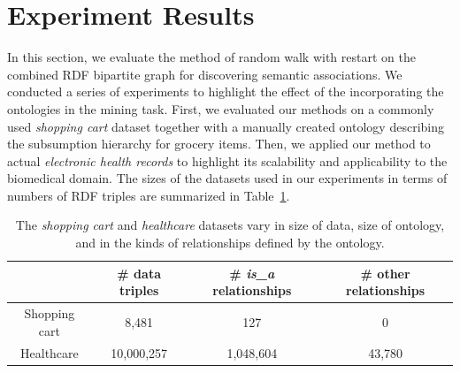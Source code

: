 \section{Experiment Results}
\label{experiment}
In this section, we evaluate the method of random walk with restart on the combined RDF bipartite graph for discovering semantic associations. We conducted a series of experiments to highlight the effect of the incorporating the ontologies in the mining task. First, we evaluated our methods on a commonly used \emph{shopping cart} dataset together with a manually created ontology describing the subsumption hierarchy for grocery items.  Then, we applied our method to actual \emph{electronic health records} to highlight its scalability and applicability to the biomedical domain. The sizes of the datasets used in our experiments in terms of numbers of RDF triples are summarized in Table~\ref{tbl:exp_overview}.


\begin{table}[tbh]\scriptsize
\begin{center}
\begin{tabular}{c|c|c|c}
\hline
    & \# data triples & \# \emph{is\_a} relationships & \# other relationships \\
    \hline
  Shopping cart     &  8,481       & 127       &    0\\
  Healthcare &  10,000,257  & 1,048,604 &    43,780\\
  \hline
\end{tabular}
\end{center}
\caption{\label{tbl:exp_overview} The \emph{shopping cart} and \emph{healthcare} datasets vary in size of data, size of ontology, and in the kinds of relationships defined by the ontology.}
\end{table}


